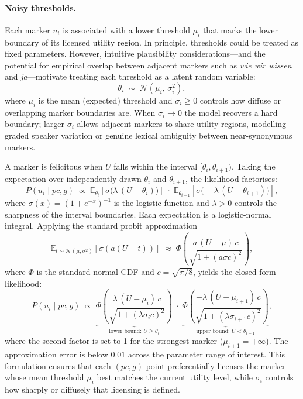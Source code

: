 \documentclass[12pt]{article}
\begin{document}
\paragraph{Noisy thresholds.}
Each marker $u_i$ is associated with a lower threshold $\mu_i$ that marks the lower boundary of its licensed utility region. In principle, thresholds could be treated as fixed parameters. However, intuitive plausibility considerations---and the potential for empirical overlap between adjacent markers such as \textit{wie wir wissen} and \textit{ja}---motivate treating each threshold as a latent random variable:
\begin{equation}
\theta_i \;\sim\; \mathcal{N}(\mu_i,\, \sigma_i^2),
\label{eq:noisy_threshold}
\end{equation}
where $\mu_i$ is the mean (expected) threshold and $\sigma_i \geq 0$ controls how diffuse or overlapping marker boundaries are. When $\sigma_i \to 0$ the model recovers a hard boundary; larger $\sigma_i$ allows adjacent markers to share utility regions, modelling graded speaker variation or genuine lexical ambiguity between near-synonymous markers.

A marker is felicitous when $U$ falls within the interval $[\theta_i, \theta_{i+1})$. Taking the expectation over independently drawn $\theta_i$ and $\theta_{i+1}$, the likelihood factorises:
\begin{equation}
P(u_i \mid pc, g)
\;\propto\;
\mathbb{E}_{\theta_i}\!\left[\sigma\!\bigl(\lambda\,(U - \theta_i)\bigr)\right]
\;\cdot\;
\mathbb{E}_{\theta_{i+1}}\!\left[\sigma\!\bigl(-\lambda\,(U - \theta_{i+1})\bigr)\right],
\label{eq:likelihood}
\end{equation}
where $\sigma(x) = (1+e^{-x})^{-1}$ is the logistic function and $\lambda > 0$ controls the sharpness of the interval boundaries. Each expectation is a logistic-normal integral. Applying the standard probit approximation
\[
\mathbb{E}_{t \sim \mathcal{N}(\mu,\sigma^2)}\!\left[\sigma(a(U-t))\right]
\;\approx\;
\Phi\!\left(\frac{a\,(U-\mu)\,c}{\sqrt{1+(a\sigma c)^2}}\right),
\]
where $\Phi$ is the standard normal CDF and $c = \sqrt{\pi/8}$, yields the closed-form likelihood:
\begin{equation}
P(u_i \mid pc, g)
\;\propto\;
\underbrace{\Phi\!\!\left(\frac{\lambda\,(U-\mu_i)\,c}{\sqrt{1+(\lambda\sigma_i c)^2}}\right)}_{\text{lower bound: }U \geq \theta_i}
\;\cdot\;
\underbrace{\Phi\!\!\left(\frac{-\lambda\,(U-\mu_{i+1})\,c}{\sqrt{1+(\lambda\sigma_{i+1} c)^2}}\right)}_{\text{upper bound: }U < \theta_{i+1}},
\label{eq:likelihood_noisy}
\end{equation}
where the second factor is set to 1 for the strongest marker ($\mu_{i+1} = +\infty$). The approximation error is below $0.01$ across the parameter range of interest. This formulation ensures that each $(pc, g)$ point preferentially licenses the marker whose mean threshold $\mu_i$ best matches the current utility level, while $\sigma_i$ controls how sharply or diffusely that licensing is defined.
\end{document}
